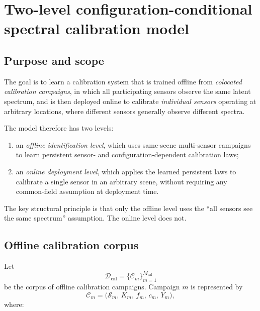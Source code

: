 
\section{Two-level configuration-conditional spectral calibration model}

\subsection{Purpose and scope}

The goal is to learn a calibration system that is trained offline from
\emph{colocated calibration campaigns}, in which all participating sensors
observe the same latent spectrum, and is then deployed online to calibrate
\emph{individual sensors} operating at arbitrary locations, where different
sensors generally observe different spectra.

The model therefore has two levels:

\begin{enumerate}
    \item an \emph{offline identification level}, which uses same-scene
    multi-sensor campaigns to learn persistent sensor- and
    configuration-dependent calibration laws;
    \item an \emph{online deployment level}, which applies the learned
    persistent laws to calibrate a single sensor in an arbitrary scene,
    without requiring any common-field assumption at deployment time.
\end{enumerate}

The key structural principle is that only the offline level uses the
``all sensors see the same spectrum'' assumption. The online level does not.

\subsection{Offline calibration corpus}

Let
\[
\mathcal D_{\mathrm{cal}}
=
\{\mathcal C_m\}_{m=1}^{M_{\mathrm{cal}}}
\]
be the corpus of offline calibration campaigns.
Campaign $m$ is represented by
\[
\mathcal C_m
=
\bigl(
\mathcal S_m,\,
K_m,\,
f_m,\,
c_m,\,
Y_m
\bigr),
\]
where:

